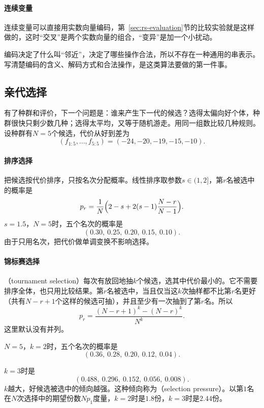 \paragraph{连续变量}
连续变量可以直接用实数向量编码，第~\ref{sec:rs-evaluation}节的比较实验就是这样做的，这时“交叉”是两个实数向量的组合，“变异”是加一个小扰动。

编码决定了什么叫“邻近”，决定了哪些操作合法，所以不存在一种通用的串表示。写清楚编码的含义、解码方式和合法操作，是这类算法要做的第一件事。

\subsection{亲代选择}
\label{sec:rs-ga-parents}

有了种群和评价，下一个问题是：谁来产生下一代的候选？选得太偏向好个体，种群很快只剩少数几种；选得太平均，又等于随机游走。用同一组数比较几种规则。设种群有$N=5$个候选，代价从好到差为
\begin{equation}
 (f_{1:5},\ldots,f_{5:5})=(-24,-20,-19,-15,-10).
 \label{eq:rs-selection-costs}
\end{equation}

\paragraph{排序选择}
把候选按代价排序，只按名次分配概率。线性排序取参数$s\in(1,2]$，第$r$名被选中的概率是
\begin{equation}
 p_r=\frac{1}{N}\Bigl(2-s+2(s-1)\frac{N-r}{N-1}\Bigr).
 \label{eq:rs-rank-selection}
\end{equation}
$s=1.5$，$N=5$时，五个名次的概率是
\[
 (0.30,\ 0.25,\ 0.20,\ 0.15,\ 0.10).
\]
由于只用名次，把代价做单调变换不影响选择。

\paragraph{锦标赛选择}
（tournament selection）每次有放回地抽$k$个候选，选其中代价最小的。它不需要排序全体，也只用比较结果。第$r$名被选中，当且仅当这$k$次抽样都不比第$r$名更好（共有$N-r+1$个这样的候选可抽），并且至少有一次抽到了第$r$名。所以
\begin{equation}
 p_r=\frac{(N-r+1)^k-(N-r)^k}{N^k}.
 \label{eq:rs-tournament}
\end{equation}
这里默认没有并列。

$N=5$，$k=2$时，五个名次的概率是
\[
 (0.36,\ 0.28,\ 0.20,\ 0.12,\ 0.04).
\]

$k=3$时是
\[
 (0.488,\ 0.296,\ 0.152,\ 0.056,\ 0.008).
\]
$k$越大，好候选被选中的倾向越强。这种倾向称为（selection pressure）。以第$1$名在$N$次选择中的期望份数$Np_1$度量，$k=2$时是$1.8$份，$k=3$时是$2.44$份。

